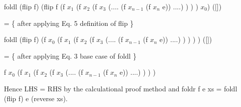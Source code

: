 \documentclass[twocolumn]{article}
\begin{document}
	 foldl (flip f) (flip f (f $x_{1}$ (f $x_{2}$ (f $x_{3}$ (.... (f $x_{n-1}$ (f $x_{n}$ e)) ....) ) ) ) $x_{0}$) ([])

	 = \{ after applying Eq. 5 definition of flip \}
	 
	 foldl (flip f) (f $x_{0}$ (f $x_{1}$ (f $x_{2}$ (f $x_{3}$ (.... (f $x_{n-1}$ (f $x_{n}$ e)) ....) ) ) ) ) ([])

	 = \{ after applying Eq. 3 base case of foldl \}
	 
	 f $x_{0}$ (f $x_{1}$ (f $x_{2}$ (f $x_{3}$ (.... (f $x_{n-1}$ (f $x_{n}$ e)) ....) ) ) )
	 
	 
	
	
	Hence LHS = RHS by the calculational proof method and foldr f e xs = foldl (flip f) e (reverse xs).

	
	


{
\footnotesize

\addtolength{\itemsep}{-2mm}

}
\end{document}
